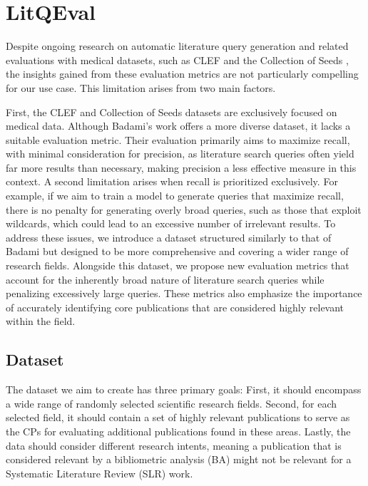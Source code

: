 {\let\clearpage\relax \chapter{LitQEval}\label{ch:ownApproach}}
Despite ongoing research on automatic literature query generation and related evaluations with medical datasets, such as CLEF \autocite{kanoulas2017clef, kanoulas2018clef, kanoulas2019clef} and the Collection of Seeds \autocite{Wang_2022}, the insights gained from these evaluation metrics are not particularly compelling for our use case. This limitation arises from two main factors. 

First, the CLEF and Collection of Seeds datasets are exclusively focused on medical data. Although Badami's work \autocite{badami2023adaptive} offers a more diverse dataset, it lacks a suitable evaluation metric. Their evaluation primarily aims to maximize recall, with minimal consideration for precision, as literature search queries often yield far more results than necessary, making precision a less effective measure in this context. A second limitation arises when recall is prioritized exclusively. For example, if we aim to train a model to generate queries that maximize recall, there is no penalty for generating overly broad queries, such as those that exploit wildcards, which could lead to an excessive number of irrelevant results. To address these issues, we introduce a dataset structured similarly to that of Badami \autocite{badami2023adaptive} but designed to be more comprehensive and covering a wider range of research fields. Alongside this dataset, we propose new evaluation metrics that account for the inherently broad nature of literature search queries while penalizing excessively large queries. These metrics also emphasize the importance of accurately identifying core publications that are considered highly relevant within the field.

\vspace*{0.5cm}\section{Dataset}\label{sec:dataset}
The dataset we aim to create has three primary goals: First, it should encompass a wide range of randomly selected scientific research fields. Second, for each selected field, it should contain a set of highly relevant publications to serve as the CPs for evaluating additional publications found in these areas. Lastly, the data should consider different research intents, meaning a publication that is considered relevant by a bibliometric analysis (BA) might not be relevant for a Systematic Literature Review (SLR) work.

